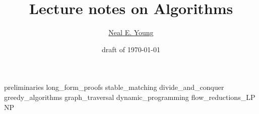 \documentclass[11pt]{report}
\title{Lecture notes on Algorithms}
\author{\href{\authorURL}{Neal E. Young}}
\date{draft of \today\\[3ex] {\small\copyrightNotice}}
\begin{document}
\hypersetup{pageanchor=false}   %
\maketitle
\hypersetup{pageanchor=true}
\bookContents
\clearpage
{}

{preliminaries}
{long_form_proofs}
{stable_matching}
{divide_and_conquer}
{greedy_algorithms}
{graph_traversal}
{dynamic_programming}
{flow_reductions_LP}
{NP}

\appendix

\end{document}
